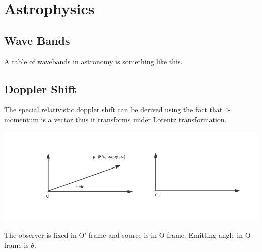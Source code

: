 \documentclass[letterpaper,10pt,english]{sphinxmanual}
\begin{document}
\section{Astrophysics}
\label{astrophysics:astrophysics}\label{astrophysics::doc}

\subsection{Wave Bands}
\label{astrophysics:wave-bands}
A table of wavebands in astronomy is something like this.


\subsection{Doppler Shift}
\label{astrophysics:doppler-shift}
The special relativistic doppler shift can be derived using the fact that 4-momentum is a vector thus it transforms under Lorentz transformation.

{\hfill\includegraphics{dopplerRedshift.png}\hfill}

The observer is fixed in O' frame and source is in O frame. Emitting angle in O frame is \(\theta\).
\end{document}
